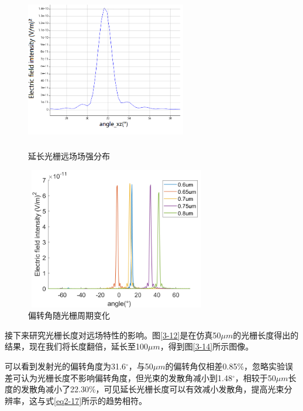 \documentclass[UTF8,a4paper,12pt]{ctexart}
\numberwithin{equation}{section}
\begin{document}
\begin{figure}[htbp]
	\centering
	\begin{minipage}{0.49\linewidth}
		\centering
		\includegraphics[height=6.3cm,width=7cm]{fig22.png}


      
 \caption{延长光栅远场场强分布}\label{3-14}%
	\end{minipage}
	\begin{minipage}{0.49\linewidth}
		\centering
		\includegraphics[height=6.2cm,width=8cm]{fig37.png}
 \caption{偏转角随光栅周期变化}
		
		\label{3-15}%
	\end{minipage}
\end{figure}


接下来研究光栅长度对远场特性的影响。图\ref{3-12}是在仿真50$\mu m$的光栅长度得出的结果，现在我们将长度翻倍，延长至100$\mu m$，得到图\ref{3-14}所示图像。



可以看到发射光的偏转角度为31.6$^\circ$，与50$\mu m$的偏转角仅相差0.85\%，忽略实验误差可认为光栅长度不影响偏转角度，但光束的发散角减小到1.48$^\circ$，相较于50$\mu m$长度的发散角减小了22.30\%，可见延长光栅长度可以有效减小发散角，提高光束分辨率，这与式\ref{eq2-17}所示的趋势相符。
\end{document}
